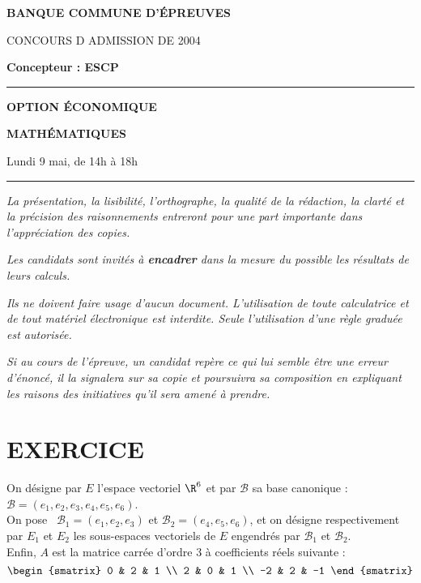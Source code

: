 \documentclass[11pt]{article}%
\begin{document}

\begin{center}
{\LARG\E\textbf{BANQUE COMMUNE D'ÉPREUVES}}



{\large \textsc{CONCOURS D ADMISSION DE 2004}}



{\large \textbf{Concepteur : ESCP}}



\rule{2.39cm}{0.05cm}



{\Large \textbf{OPTION ÉCONOMIQUE}}



{\Large \textbf{MATHÉMATIQUES }}



{\Large Lundi 9 mai, de 14h à 18h}



\rule{2.39cm}{0.05cm}
\end{center}

\textit{La présentation, la lisibilité, l'orthographe, la qualité
de la rédaction, la clarté et la précision des raisonnements
entreront pour une part importante dans l'appréciation des copies.}

\textit{Les candidats sont invités à \textbf{encadrer} dans la mesure
du possible les résultats de leurs calculs.}

\textit{Ils ne doivent faire usage d'aucun document. L'utilisation de
toute
calculatrice et de tout matériel électronique est interdite. Seule
l'utilisation d'une règle graduée est autorisée.}

\textit{Si au cours de l'épreuve, un candidat repère ce qui lui semble
être une erreur d'énoncé, il la signalera sur sa copie et
poursuivra sa composition en expliquant les raisons des initiatives
qu'il sera
amené à prendre.}

\vspace*{3cm}

\section*{EXERCICE}

On désigne par $E$ l'espace vectoriel $\R^{6}$ et par $\mathcal{B}$
sa base canonique : \ $\mathcal{B} =
(e_{1},e_{2},e_{3},e_{4},e_{5},e_{6})$. 
\\
On pose \ $\mathcal{B}_{1} = (e_{1},e_{2},e_{3})$ et $\mathcal{B}_{2} =
(e_{4},e_{5},e_{6})$, et on désigne respectivement par $E_{1}$ et
$E_{2} $ les sous-espaces vectoriels de $E$ engendrés par
$\mathcal{B}_{1}$
et $\mathcal{B}_{2}$. \\
Enfin, $A$ est la matrice carrée d'ordre $3$ à coefficients réels
suivante : 
\[
\begin{smatrix}
0 & 2 & 1 \\
2 & 0 & 1 \\
-2 & 2 & -1
\end{smatrix}
\]
\end{document}
